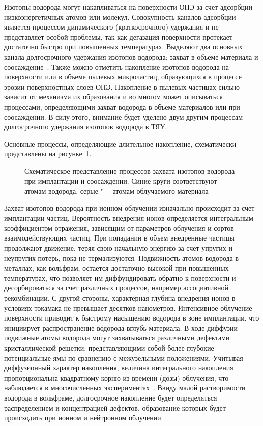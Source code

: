 Изотопы водорода могут накапливаться на поверхности ОПЭ за счет адсорбции низкоэнергетичных атомов или молекул. Совокупность каналов адсорбции является процессом динамического (краткосрочного) удержания и не представляет особой проблемы, так как дегазация поверхности протекает достаточно быстро при повышенных температурах. Выделяют два основных канала долгосрочного удержания изотопов водорода: захват в объеме материала и соосаждение~\cite{Gasparyan2024, Skinner2009}. Также можно отметить накопление изотопов водорода на поверхности или в объеме пылевых микрочастиц, образующихся в процессе эрозии поверхностных слоев ОПЭ. Накопление в пылевых частицах сильно зависит от механизма их образования и во многом может описываться процессами, определяющими захват водорода в объеме материалов или при соосаждении.  В силу этого, внимание будет уделено двум другим процессам долгосрочного удержания изотопов водорода в ТЯУ.

Основные процессы, определяющие длительное накопление, схематически представлены на рисунке~\cref{fig:ch1/retention_mechanisms}.
\begin{figure}[ht]
    \caption{Схематическое представление процессов захвата изотопов водорода при имплантации и соосаждении. Синие круги соответствуют атомам водорода, серые "--- атомам облучаемого материала}\label{fig:ch1/retention_mechanisms}
\end{figure}
Захват изотопов водорода при ионном облучении изначально происходит за счет имплантации частиц. Вероятность внедрения ионов определяется интегральным коэффициентом отражения, зависящим от параметров облучения и сортов взаимодействующих частиц. При попадании в объем внедренные частицы продолжают движение, теряя свою начальную энергию за счет упругих и неупругих потерь, пока не термализуются. Подвижность атомов водорода в металлах, как вольфрам, остается достаточно высокой при повышенных температурах, что позволяет им диффундировать обратно к поверхности и десорбироваться за счет различных процессов, например ассоциативной рекомбинации. С другой стороны, характерная глубина внедрения ионов в условиях токамака не превышает десятков нанометров. Интенсивное облучение поверхности приводит к быстрому насыщению водорода в зоне имплантации, что инициирует распространение водорода вглубь материала. В ходе диффузии подвижные атомы водорода могут захватываться различными дефектами кристаллической решетки, представляющими собой более глубокие потенциальные ямы по сравнению с межузельными положениями. Учитывая диффузионный характер накопления, величина интегрального накопления пропорциональна квадратному корню из времени (дозы) облучения, что наблюдается в многочисленных экспериментах~\cite{Ogorodnikova2003,Ogorodnikova2009,Sugiyama2014,Zhang2020}. Ввиду малой растворимости водорода в вольфраме, долгосрочное накопление будет определяться распределением и концентрацией дефектов, образование которых будет происходить при ионном и нейтронном облучении.

